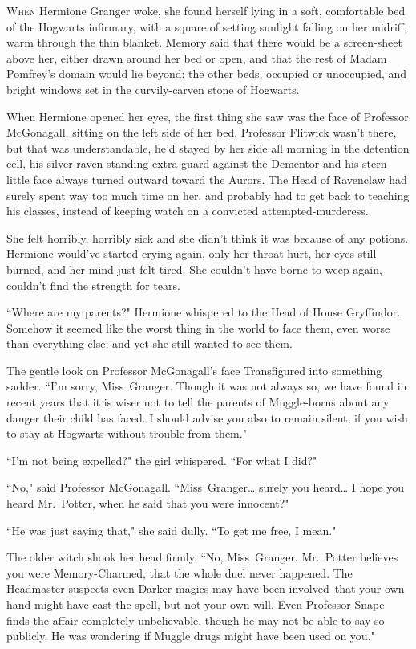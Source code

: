 
\lettrine{W}{hen} Hermione Granger woke, she found herself lying in a soft, comfortable bed of the Hogwarts infirmary, with a square of setting sunlight falling on her midriff, warm through the thin blanket. Memory said that there would be a screen-sheet above her, either drawn around her bed or open, and that the rest of Madam Pomfrey's domain would lie beyond: the other beds, occupied or unoccupied, and bright windows set in the curvily-carven stone of Hogwarts.

When Hermione opened her eyes, the first thing she saw was the face of Professor McGonagall, sitting on the left side of her bed. Professor Flitwick wasn't there, but that was understandable, he'd stayed by her side all morning in the detention cell, his silver raven standing extra guard against the Dementor and his stern little face always turned outward toward the Aurors. The Head of Ravenclaw had surely spent way too much time on her, and probably had to get back to teaching his classes, instead of keeping watch on a convicted attempted-murderess.

She felt horribly, horribly sick and she didn't think it was because of any potions. Hermione would've started crying again, only her throat hurt, her eyes still burned, and her mind just felt tired. She couldn't have borne to weep again, couldn't find the strength for tears.

``Where are my parents?" Hermione whispered to the Head of House Gryffindor. Somehow it seemed like the worst thing in the world to face them, even worse than everything else; and yet she still wanted to see them.

The gentle look on Professor McGonagall's face Transfigured into something sadder. ``I'm sorry, Miss~Granger. Though it was not always so, we have found in recent years that it is wiser not to tell the parents of Muggle-borns about any danger their child has faced. I should advise you also to remain silent, if you wish to stay at Hogwarts without trouble from them."

``I'm not being expelled?" the girl whispered. ``For what I did?"

``No," said Professor McGonagall. ``Miss~Granger{\ldots} surely you heard{\ldots} I hope you heard Mr.~Potter, when he said that you were innocent?"

``He was just saying that," she said dully. ``To get me free, I mean."

The older witch shook her head firmly. ``No, Miss~Granger. Mr.~Potter believes you were Memory-Charmed, that the whole duel never happened. The Headmaster suspects even Darker magics may have been involved\---that your own hand might have cast the spell, but not your own will. Even Professor Snape finds the affair completely unbelievable, though he may not be able to say so publicly. He was wondering if Muggle drugs might have been used on you."

